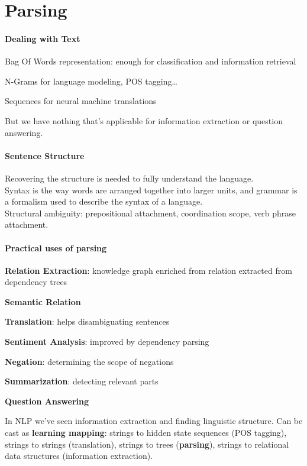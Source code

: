 \documentclass[10pt]{report}
\begin{document}
\section{Parsing}
\paragraph{Dealing with Text}
\begin{list}{}{}
	\item Bag Of Words representation: enough for classification and information retrieval
	\item N-Grams for language modeling, POS tagging\ldots
	\item Sequences for neural machine translations
\end{list}
But we have nothing that's applicable for information extraction or question answering.
\paragraph{Sentence Structure} Recovering the structure is needed to fully understand the language.\\
Syntax is the way words are arranged together into larger units, and grammar is a formalism used to describe the syntax of a language.\\
Structural ambiguity: prepositional attachment, coordination scope, verb phrase attachment.
\paragraph{Practical uses of parsing} \begin{list}{}{}
	\item \textbf{Relation Extraction}: knowledge graph enriched from relation extracted from dependency trees
	\item \textbf{Semantic Relation}
	\item \textbf{Translation}: helps disambiguating sentences
	\item \textbf{Sentiment Analysis}: improved by dependency parsing
	\item \textbf{Negation}: determining the scope of negations
	\item \textbf{Summarization}: detecting relevant parts
	\item \textbf{Question Answering}
\end{list}
In NLP we've seen information extraction and finding linguistic structure. Can be cast as \textbf{learning mapping}: strings to hidden state sequences (POS tagging), strings to strings (translation), strings to trees (\textbf{parsing}), strings to relational data structures (information extraction).
\end{document}
